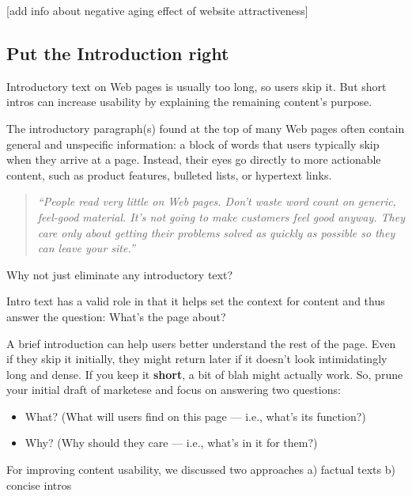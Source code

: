 [add info about negative aging effect of website attractiveness]

\subsection{Put the Introduction right} %
\label{sub:put_the_introduction_right}

Introductory text on Web pages is usually too long, so users skip it. But short intros can increase usability by explaining the remaining content's purpose.

The introductory paragraph(s) found at the top of many Web pages often contain general and unspecific information: a block of words that users typically skip when they arrive at a page. Instead, their eyes go directly to more actionable content, such as product features, bulleted lists, or hypertext links.

\begin{quote}
\emph{``People read very little on Web pages. Don't waste word count on generic, feel-good material. It's not going to make customers feel good anyway. They care only about getting their problems solved as quickly as possible so they can leave your site.''}~
\end{quote}

Why not just eliminate any introductory text?

Intro text has a valid role in that it helps set the context for content and thus answer the question: What's the page about?

A brief introduction can help users better understand the rest of the page. Even if they skip it initially, they might return later if it doesn't look intimidatingly long and dense. If you keep it \textbf{short}, a bit of blah might actually work. So, prune your initial draft of marketese and focus on answering two questions:

\begin{itemize}
	\item What? (What will users find on this page --- i.e., what's its function?)
	\item Why? (Why should they care --- i.e., what's in it for them?)
\end{itemize}

For improving content usability, we discussed two approaches
a) factual texts
b) concise intros

